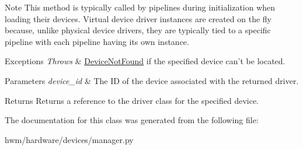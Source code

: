 \begin{DoxyNote}{Note}
This method is typically called by pipelines during initialization when loading their devices. Virtual device driver instances are created on the fly because, unlike physical device drivers, they are typically tied to a specific pipeline with each pipeline having its own instance.
\end{DoxyNote}

\begin{DoxyExceptions}{Exceptions}
{\em Throws} & \hyperlink{classhwm_1_1hardware_1_1devices_1_1manager_1_1_device_not_found}{Device\-Not\-Found} if the specified device can't be located.\\
\hline
\end{DoxyExceptions}

\begin{DoxyParams}{Parameters}
{\em device\-\_\-id} & The I\-D of the device associated with the returned driver. \\
\hline
\end{DoxyParams}
\begin{DoxyReturn}{Returns}
Returns a reference to the driver class for the specified device. 
\end{DoxyReturn}


The documentation for this class was generated from the following file\-:\begin{DoxyCompactItemize}
\item 
hwm/hardware/devices/manager.\-py\end{DoxyCompactItemize}
